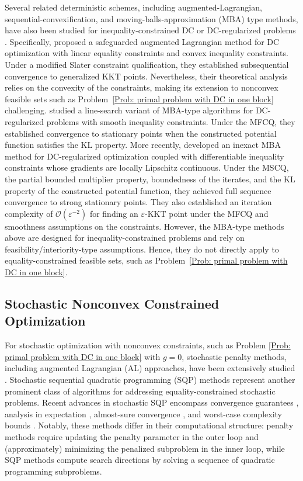 \documentclass{article}
\theoremstyle{plain}
\theoremstyle{definition}
\theoremstyle{remark}
\newcommand{\calO}{\mathcal{O}}
\numberwithin{equation}{section}
\begin{document}
Several related deterministic schemes, including augmented-Lagrangian, sequential-convexification, and moving-balls-approximation (MBA) type methods, have also been studied for inequality-constrained DC or DC-regularized problems \citep{kanzow2025adaptive,liu2025convergence,yu2021convergence}. Specifically, \citet{kanzow2025adaptive} proposed a safeguarded augmented Lagrangian method for DC optimization with linear equality constraints and convex inequality constraints. Under a modified Slater constraint qualification, they established subsequential convergence to generalized KKT points. Nevertheless, their theoretical analysis relies on the convexity of the constraints, making its extension to nonconvex feasible sets such as Problem~\eqref{Prob: primal problem with DC in one block} challenging. \citet{yu2021convergence} studied a line-search variant of MBA-type algorithms for DC-regularized problems with smooth inequality constraints. Under the MFCQ, they established convergence to stationary points when the constructed potential function satisfies the KL property. More recently, \citet{liu2025convergence} developed an inexact MBA method for DC-regularized optimization coupled with differentiable inequality constraints whose gradients are locally Lipschitz continuous. Under the MSCQ, the partial bounded multiplier property, boundedness of the iterates, and the KL property of the constructed potential function, they achieved full sequence convergence to strong stationary points. They also established an iteration complexity of \(\calO(\varepsilon^{-2})\) for finding an \(\varepsilon\)-KKT point under the MFCQ and smoothness assumptions on the constraints. However, the MBA-type methods above are designed for inequality-constrained problems and rely on feasibility/interiority-type assumptions. Hence, they do not directly apply to equality-constrained feasible sets, such as Problem~\eqref{Prob: primal problem with DC in one block}.

\subsection{Stochastic Nonconvex Constrained Optimization}
\label{app:related_work_stochastic_nonconvex_constrained}
For stochastic optimization with nonconvex constraints, such as Problem \eqref{Prob: primal problem with DC in one block} with $g = 0$, stochastic penalty methods, including augmented Lagrangian (AL) approaches, have been extensively studied \citep{kushner1974penalty,wang2017penalty,xu2020primal}. Stochastic sequential quadratic programming (SQP) methods represent another prominent class of algorithms for addressing equality-constrained stochastic problems. Recent advances in stochastic SQP encompass convergence guarantees \citep{BeraCurtRobiZhou21, na2021inequality}, analysis in expectation \citep{NaAnitKola22}, almost-sure convergence \citep{curtis2023almost}, and worst-case complexity bounds \citep{BeraBollZhou22, NaMaho22,curtis2024worst}. {Notably, these methods differ in their computational structure:} penalty methods require updating the penalty parameter in the outer loop and (approximately) minimizing the penalized subproblem in the inner loop, while SQP methods compute search directions by solving a sequence of quadratic programming subproblems.
\end{document}
